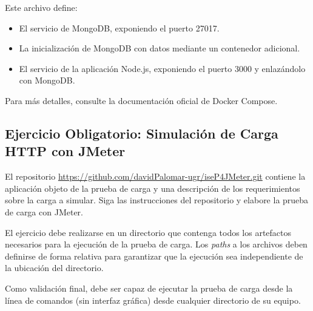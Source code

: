 Este archivo define:
\begin{itemize}
    \item El servicio de MongoDB, exponiendo el puerto 27017.
    \item La inicialización de MongoDB con datos mediante un contenedor adicional.
    \item El servicio de la aplicación Node.js, exponiendo el puerto 3000 y enlazándolo con MongoDB.
\end{itemize}

Para más detalles, consulte la documentación oficial de Docker Compose.

\subsection*{Ejercicio Obligatorio: Simulación de Carga HTTP con JMeter}

El repositorio \url{https://github.com/davidPalomar-ugr/iseP4JMeter.git} contiene la aplicación objeto de la prueba de carga y una descripción de los requerimientos sobre la carga a simular. Siga las instrucciones del repositorio y elabore la prueba de carga con JMeter.

El ejercicio debe realizarse en un directorio que contenga todos los artefactos necesarios para la ejecución de la prueba de carga. Los \textit{paths} a los archivos deben definirse de forma relativa para garantizar que la ejecución sea independiente de la ubicación del directorio. 

Como validación final, debe ser capaz de ejecutar la prueba de carga desde la línea de comandos (sin interfaz gráfica) desde cualquier directorio de su equipo.

